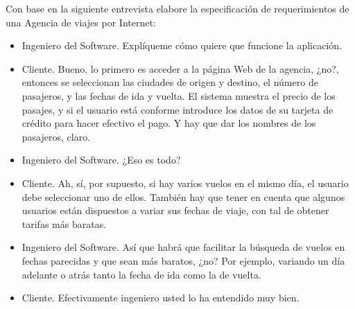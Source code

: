 Con base en la siguiente entrevista elabore la especificación de requerimientos de una Agencia de viajes por Internet:

\begin{itemize}
\item Ingeniero del Software. Explíqueme cómo quiere que funcione la aplicación.
\item Cliente. Bueno, lo primero es acceder a la página Web de la agencia, ¿no?, entonces se seleccionan las  ciudades de origen y destino, el número de pasajeros, y las fechas de ida y vuelta. El sistema muestra el  precio de los pasajes, y si el usuario está conforme introduce los datos de su tarjeta de crédito para hacer  efectivo el pago. Y hay que dar los nombres de los pasajeros, claro.
\item Ingeniero del Software. ¿Eso es todo?
\item Cliente. Ah, sí, por supuesto, si hay varios vuelos en el mismo día, el usuario debe seleccionar uno de  ellos. También hay que tener en cuenta que algunos usuarios están dispuestos a variar sus fechas de  viaje, con tal de obtener tarifas más baratas.
\item Ingeniero del Software. Así que habrá que facilitar la búsqueda de vuelos en fechas parecidas y que sean  más baratos, ¿no? Por ejemplo, variando un día adelante o atrás tanto la fecha de ida como la de vuelta.
\item Cliente. Efectivamente ingeniero usted lo ha entendido muy bien.
\end{itemize}
